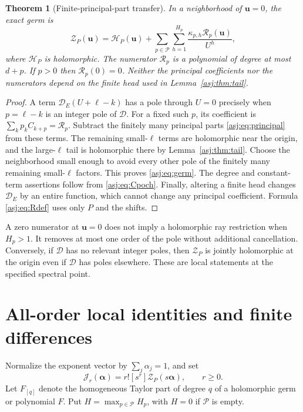 \documentclass[11pt]{article}
\numberwithin{equation}{section}
\newtheorem{theorem}{Theorem}[section]
\theoremstyle{definition}\newtheorem{definition}[theorem]{Definition}
\theoremstyle{remark}\newtheorem{remark}[theorem]{Remark}\newtheorem{example}[theorem]{Example}
\newcommand{\D}{\mathscr D}\newcommand{\calH}{\mathcal H}\newcommand{\calR}{\mathcal R}
\newcommand{\calJ}{\mathcal J}\newcommand{\calZ}{\mathcal Z}
\begin{document}
\begin{theorem}[Finite-principal-part transfer]\label{asj:thm:transfer}
In a neighborhood of $\boldsymbol u=0$, the exact germ is
\begin{equation}\label{asj:eq:germ}
 \boxed{\displaystyle
 \calZ_P(\boldsymbol u)
  =\calH_P(\boldsymbol u)
       +\sum_{p\in\mathcal P}\sum_{h=1}^{H_p}
            \frac{\kappa_{p,h}\calR_p(\boldsymbol u)}{U^h},}
\end{equation}
where $\calH_P$ is holomorphic. The numerator $\calR_p$ is a polynomial
of degree at most $d+p$. If $p>0$ then $\calR_p(0)=0$.
Neither the principal coefficients nor the numerators depend on the
finite head used in Lemma~\ref{asj:thm:tail}.
\end{theorem}
\begin{proof}
A term $\D_E(U+\ell-k)$ has a pole through $U=0$ precisely when
$p=\ell-k$ is an integer pole of $\D$. For a fixed such $p$, its
coefficient is $\sum_k p_k C_{k+p}=\calR_p$. Subtract the finitely many
principal parts \eqref{asj:eq:principal} from these terms. The remaining
small-$\ell$ terms are holomorphic near the origin, and the large-$\ell$
tail is holomorphic there by Lemma~\ref{asj:thm:tail}. Choose the neighborhood
small enough to avoid every other pole of the finitely many remaining
small-$\ell$ factors. This proves \eqref{asj:eq:germ}.
The degree and constant-term assertions follow from \eqref{asj:eq:Cpoch}.
Finally, altering a finite head changes $\D_E$ by an entire function,
which cannot change any principal coefficient. Formula \eqref{asj:eq:Rdef}
uses only $P$ and the shifts.
\end{proof}

A zero numerator at $\boldsymbol u=0$ does not imply a holomorphic ray
restriction when $H_p>1$. It removes at most one order of the pole without
additional cancellation. Conversely, if $\D$ has no relevant integer poles,
then $\calZ_P$ is jointly holomorphic at the origin even if $\D$ has poles
elsewhere. These are local statements at the specified spectral point.



\section{All-order local identities and finite differences}
\label{asj:sec:local}

Normalize the exponent vector by $\sum_j\alpha_j=1$, and set
\begin{equation}\label{asj:eq:Jnormalized}
 \calJ_r(\boldsymbol\alpha)
  =r![s^r]\calZ_P(s\boldsymbol\alpha),\qquad r\ge0.
\end{equation}
Let $F_{[q]}$ denote the homogeneous Taylor part of degree $q$ of a
holomorphic germ or polynomial $F$. Put
$H=\max_{p\in\mathcal P}H_p$, with $H=0$ if $\mathcal P$ is empty.
\end{document}
